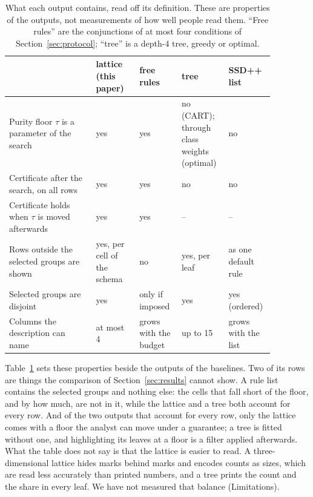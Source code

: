 \documentclass[11pt]{article}
\begin{document}
\begin{table}[t]\centering\footnotesize\setlength{\tabcolsep}{4pt}
\caption{What each output contains, read off its definition. These are properties of the outputs, not measurements of how well people read them. ``Free rules'' are the conjunctions of at most four conditions of Section~\ref{sec:protocol}; ``tree'' is a depth-4 tree, greedy or optimal.}\label{tab:properties}
\begin{tabular}{>{\raggedright\arraybackslash}p{0.30\linewidth}>{\raggedright\arraybackslash}p{0.15\linewidth}>{\raggedright\arraybackslash}p{0.14\linewidth}>{\raggedright\arraybackslash}p{0.15\linewidth}>{\raggedright\arraybackslash}p{0.13\linewidth}}
\toprule
& lattice (this paper) & free rules & tree & SSD++ list\\
\midrule
Purity floor $\tau$ is a parameter of the search & yes & yes & no (CART); through class weights (optimal) & no\\
Certificate after the search, on all rows & yes & yes & no & no\\
Certificate holds when $\tau$ is moved afterwards & yes & yes & -- & --\\
Rows outside the selected groups are shown & yes, per cell of the schema & no & yes, per leaf & as one default rule\\
Selected groups are disjoint & yes & only if imposed & yes & yes (ordered)\\
Columns the description can name & at most 4 & grows with the budget & up to 15 & grows with the list\\
\bottomrule
\end{tabular}
\end{table}

Table~\ref{tab:properties} sets these properties beside the outputs of the baselines. Two of its rows are things the comparison of Section~\ref{sec:results} cannot show. A rule list contains the selected groups and nothing else: the cells that fall short of the floor, and by how much, are not in it, while the lattice and a tree both account for every row. And of the two outputs that account for every row, only the lattice comes with a floor the analyst can move under a guarantee; a tree is fitted without one, and highlighting its leaves at a floor is a filter applied afterwards. What the table does not say is that the lattice is easier to read. A three-dimensional lattice hides marks behind marks and encodes counts as sizes, which are read less accurately than printed numbers, and a tree prints the count and the share in every leaf. We have not measured that balance (Limitations).
\end{document}
